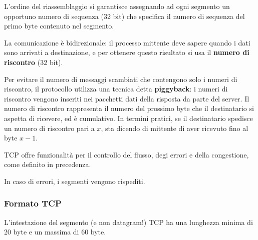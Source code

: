     L'ordine del riassemblaggio si garantisce assegnando ad ogni segmento un opportuno numero di sequenza (32 bit) che specifica il numero di sequenza del primo byte contenuto nel segmento.
    
    \vspace{3mm}
    
    La comunicazione è bidirezionale: il processo mittente deve sapere quando i dati sono arrivati a destinazione, e per ottenere questo risultato si usa il \textbf{numero di riscontro} (32 bit). 
    
    Per evitare il numero di messaggi scambiati che contengono solo i numeri di riscontro, il protocollo utilizza una tecnica detta \textbf{piggyback}: i numeri di riscontro vengono inseriti nei pacchetti dati della risposta da parte del server. Il numero di riscontro rappresenta il numero del prossimo byte che il destinatario si aspetta di ricevere, ed è cumulativo. In termini pratici, se il destinatario spedisce un numero di riscontro pari a $x$, sta dicendo di mittente di aver ricevuto fino al byte $x-1$.
    
    \vspace{3mm}
    
    TCP offre funzionalità per il controllo del flusso, degi errori e della congestione, come definito in precedenza. 
    
    In caso di errori, i segmenti vengono rispediti.
    
    \subsubsection{Formato TCP}
    
        L'intestazione del segmento (e non datagram!) TCP ha una lunghezza minima di 20 byte e un massima di 60 byte.
        

